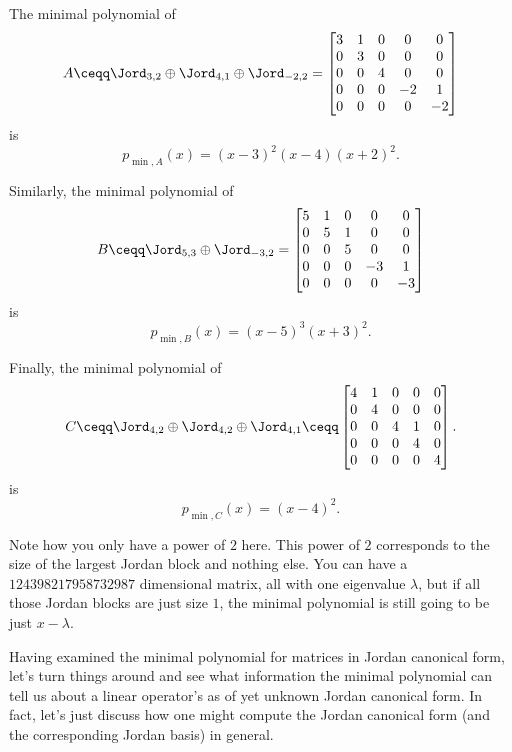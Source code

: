 \begin{exm}{}{}
	The minimal polynomial of
	\begin{equation}
		A\ceqq \Jord _{3,2}\oplus \Jord _{4,1}\oplus \Jord _{-2,2}=\begin{bmatrix}3 & 1 & 0 & 0 & 0 \\ 0 & 3 & 0 & 0 & 0 \\ 0 & 0 & 4 & 0 & 0 \\ 0 & 0 & 0 & -2 & 1 \\ 0 & 0 & 0 & 0 & -2\end{bmatrix}
	\end{equation}
	is
	\begin{equation}
		p_{\min ,A}(x)=(x-3)^2(x-4)(x+2)^2.
	\end{equation}
	
	Similarly, the minimal polynomial of
	\begin{equation}
		B\ceqq \Jord _{5,3}\oplus \Jord _{-3,2}=\begin{bmatrix}5 & 1 & 0 & 0 & 0 \\ 0 & 5 & 1 & 0 & 0 \\ 0 & 0 & 5 & 0 & 0 \\ 0 & 0 & 0 & -3 & 1 \\ 0 & 0 & 0 & 0 & -3\end{bmatrix}
	\end{equation}
	is
	\begin{equation}
		p_{\min ,B}(x)=(x-5)^3(x+3)^2.
	\end{equation}
	
	Finally, the minimal polynomial of
	\begin{equation}
		C\ceqq \Jord _{4,2}\oplus \Jord _{4,2}\oplus \Jord _{4,1}\ceqq \begin{bmatrix}4 & 1 & 0 & 0 & 0 \\ 0 & 4 & 0 & 0 & 0 \\ 0 & 0 & 4 & 1 & 0 \\ 0 & 0 & 0 & 4 & 0 \\ 0 & 0 & 0 & 0 & 4\end{bmatrix}.
	\end{equation}
	is
	\begin{equation}
		p_{\min ,C}(x)=(x-4)^2.
	\end{equation}
	\begin{rmk}
		Note how you only have a power of $2$ here.  This power of $2$ corresponds to the size of the largest Jordan block and nothing else.  You can have a $124398217958732987$ dimensional matrix, all with one eigenvalue $\lambda$, but if all those Jordan blocks are just size $1$, the minimal polynomial is still going to be just $x-\lambda$.
	\end{rmk}
\end{exm}
Having examined the minimal polynomial for matrices in Jordan canonical form, let's turn things around and see what information the minimal polynomial can tell us about a linear operator's as of yet unknown Jordan canonical form.  In fact, let's just discuss how one might compute the Jordan canonical form (and the corresponding Jordan basis) in general.

